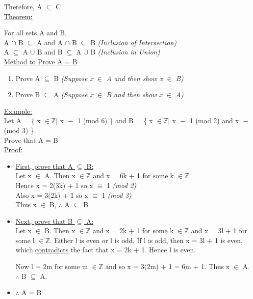\documentclass{article}
\begin{document}
Therefore, A $\subseteq$ C \\

\underline{Theorem:}

For all sets A and B, \\

A $\cap$ B $\subseteq$ A and A $\cap$ B $\subseteq$ B \textit{(Inclusion of Intersection)} \\

A $\subseteq$ A $\cup$ B and B $\subseteq$ A $\cup$ B \textit{(Inclusion in Union)} \\

\underline{Method to Prove A = B}

\begin{enumerate}
\item Prove A $\subseteq$ B \textit{(Suppose x $\in$ A and then show x $\in$ B)}
\item Prove B $\subseteq$ A \textit{(Suppose x $\in$ B and then show x $\in$ A)}
\end{enumerate}

\underline{Example:}\\

Let A = \{ x $\in \mathbb{Z} |$ x $\equiv$ 1 (mod 6) \} and B = \{ x $\in \mathbb{Z} |$ x $\equiv$ 1 (mod 2) and x $\equiv$ (mod 3) \} \\

Prove that A = B \\

\underline{Proof:} 
\begin{itemize}
\item \underline{First, prove that A $\subseteq$ B:} \\
Let x $\in$ A. Then x $\in \mathbb{Z}$ and x = 6k + 1 for some k $\in \mathbb{Z}$ \\

Hence x = 2(3k) + 1 so x $\equiv$ 1 \textit{(mod 2)} \\

Also x = 3(2k) + 1 so x $\equiv$ 1 \textit{(mod 3)} \\

Thus x $\in$ B, $\therefore$ A $\subseteq$ B

\item \underline{Next, prove that B $\subseteq$ A:} \\
Let x $\in$ B. Then x $\in \mathbb{Z}$ and x = 2k + 1 for some k $\in \mathbb{Z}$ and x = 3l + 1 for some l $\in \mathbb{Z}$. Either
l is even or l is odd. If l is odd, then x = 3l + 1 is even, which \underline{contradicts} the fact that x = 2k + 1. Hence l is even.

Now l = 2m for some m $\in \mathbb{Z}$ and so x = 3(2m) + 1 = 6m + 1. Thus x $\in$ A. $\therefore$ B $\subseteq$ A.

\item $\therefore$ A = B
\end{itemize}
\end{document}
